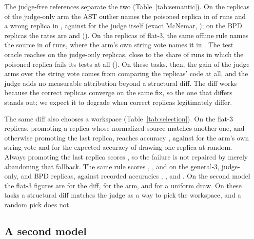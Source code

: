 \documentclass[11pt]{article}
\begin{document}
The judge-free references separate the two (Table~\ref{tab:semantic}).
On the replicas of the judge-only arm the AST outlier names the poisoned replica in \RateSemMainJudgeOnlyCodeAst{} of runs and a wrong replica in \RateSemMainJudgeOnlyCodeAstWrong{}, against \RateSemMainJudgeOnlyCodeMethod{} for the judge itself (exact McNemar, \PvalSemMainJudgeOnlyCodeMethodVsAst{}); on the BPD replicas the rates are \RateSemMainBpdCodeAst{} and \RateSemMainBpdCodeMethod{} (\PvalSemMainBpdCodeMethodVsAst{}).
On the replicas of flat-3, the same offline rule names the source in \RateSemMainFlatThreeCodeAst{} of runs, where the arm's own string vote names it in \RateSemMainFlatThreeCodeMethod{}.
The test oracle reaches \RateSemMainJudgeOnlyCodeOracle{} on the judge-only replicas, close to the share of runs in which the poisoned replica fails its tests at all (\RateSemMainJudgeOnlyCodePoisonedFails{}).
On these tasks, then, the gain of the judge arms over the string vote comes from comparing the replicas' code at all, and the judge adds no measurable attribution beyond a structural diff.
The diff works because the correct replicas converge on the same fix, so the one that differs stands out; we expect it to degrade when correct replicas legitimately differ.

The same diff also chooses a workspace (Table~\ref{tab:selection}).
On the flat-3 replicas, promoting a replica whose normalized source matches another one, and otherwise promoting the last replica, reaches accuracy \RateSelMainFlatThreeCodeAst{}, against \RateSelMainFlatThreeCodeActual{} for the arm's own string vote and \RateSelMainFlatThreeCodeUniform{} for the expected accuracy of drawing one replica at random.
Always promoting the last replica scores \RateSelMainFlatThreeCodeLast{}, so the failure is not repaired by merely abandoning that fallback.
The same rule scores \RateSelMainGenThreeCodeAst{}, \RateSelMainJudgeOnlyCodeAst{}, and \RateSelMainBpdCodeAst{} on the general-3, judge-only, and BPD replicas, against recorded accuracies \RateSelMainGenThreeCodeActual{}, \RateSelMainJudgeOnlyCodeActual{}, and \RateSelMainBpdCodeActual{}.
On the second model the flat-3 figures are \RateSelBEightFlatThreeCodeAst{} for the diff, \RateSelBEightFlatThreeCodeActual{} for the arm, and \RateSelBEightFlatThreeCodeUniform{} for a uniform draw.
On these tasks a structural diff matches the judge as a way to pick the workspace, and a random pick does not.



\subsection{A second model}
\label{sec:second}

\end{document}
